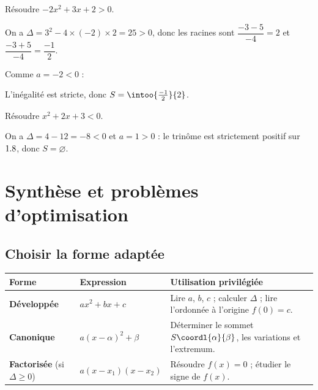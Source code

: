 \begin{ex}
	Résoudre $-2x^2 + 3x + 2 > 0$.

	On a $\Delta = 3^2 - 4 \times (-2) \times 2 = 25 > 0$, donc les racines sont $\dfrac{-3 - 5}{-4} = 2$ et $\dfrac{-3 + 5}{-4} = \dfrac{-1}{2}$.

	Comme $a = -2 < 0$ :
	\begin{center}
	\end{center}

	L'inégalité est stricte, donc $S = \intoo{\frac{-1}{2}}{2}$.
\end{ex}

\begin{ex}
	Résoudre $x^2 + 2x + 3 < 0$.

	On a $\Delta = 4 - 12 = -8 < 0$ et $a = 1 > 0$ : le trinôme est strictement positif sur $1.8$, donc $S = \varnothing$.
\end{ex}

\section{Synthèse et problèmes d'optimisation}

\subsection{Choisir la forme adaptée}

\begin{center}
	\renewcommand{\arraystretch}{1.5}
	\begin{tabular}{|>{\raggedright\arraybackslash}m{3.6cm}|>{\centering\arraybackslash}m{4.4cm}|>{\raggedright\arraybackslash}m{7.6cm}|}
		\hline
		\ccg \textbf{Forme}                      & \ccg \textbf{Expression}  & \ccg \textbf{Utilisation privilégiée}                                            \\ \hline
		\textbf{Développée}                      & $ax^2 + bx + c$           & Lire $a$, $b$, $c$ ; calculer $\Delta$ ; lire l'ordonnée à l'origine $f(0) = c$. \\ \hline
		\textbf{Canonique}                       & $a(x - \alpha)^2 + \beta$ & Déterminer le sommet $S\coordl{\alpha}{\beta}$, les variations et l'extremum.    \\ \hline
		\textbf{Factorisée} (si $\Delta \geq 0$) & $a(x - x_1)(x - x_2)$     & Résoudre $f(x) = 0$ ; étudier le signe de $f(x)$.                                \\ \hline
	\end{tabular}
\end{center}

